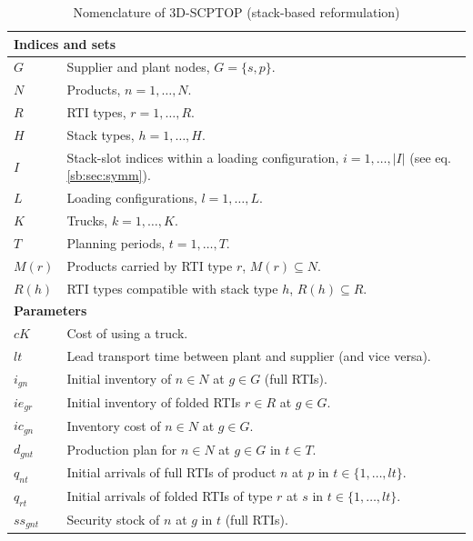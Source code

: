 \begin{longtable}[hbt!]{|p{}|p{}|}
    \caption{Nomenclature of 3D-SCPTOP (stack-based reformulation)}
    \label{tab:sb-Nomenclature}\\
    \hline
    \multicolumn{2}{|l|}{\textbf{Indices and sets}}\\\hline
    $G$            & Supplier and plant nodes, $G=\{s,p\}$.\\
    $N$            & Products, $n=1,\dots,N$.\\
    $R$            & RTI types, $r=1,\dots,R$.\\
    $H$            & Stack types, $h=1,\dots,H$.\\
    $I$            & Stack-slot indices within a loading configuration, $i=1,\dots,|I|$ (see eq. \ref{sb:sec:symm}).\\
    $L$            & Loading configurations, $l=1,\dots,L$.\\
    $K$            & Trucks, $k=1,\dots,K$.\\
    $T$            & Planning periods, $t=1,\dots,T$.\\
    $M(r)$         & Products carried by RTI type $r$, $M(r)\subseteq N$.\\
    $R(h)$         & RTI types compatible with stack type $h$, $R(h)\subseteq R$.\\
    \hline
    \multicolumn{2}{|l|}{\textbf{Parameters}}\\\hline
    $cK$           & Cost of using a truck.\\
    $lt$           & Lead transport time between plant and supplier (and vice versa).\\
    $i_{gn}$       & Initial inventory of $n\in N$ at $g\in G$ (full RTIs).\\
    $ie_{gr}$      & Initial inventory of folded RTIs $r\in R$ at $g\in G$.\\
    $ic_{gn}$      & Inventory cost of $n\in N$ at $g\in G$.\\
    $d_{gnt}$      & Production plan for $n\in N$ at $g\in G$ in $t\in T$.\\
    $q_{nt}$       & Initial arrivals of full RTIs of product $n$ at $p$ in $t\in\{1,\dots,lt\}$.\\
    $q_{rt}$       & Initial arrivals of folded RTIs of type $r$ at $s$ in $t\in\{1,\dots,lt\}$.\\
    $ss_{gnt}$     & Security stock of $n$ at $g$ in $t$ (full RTIs).\\

\end{longtable}
